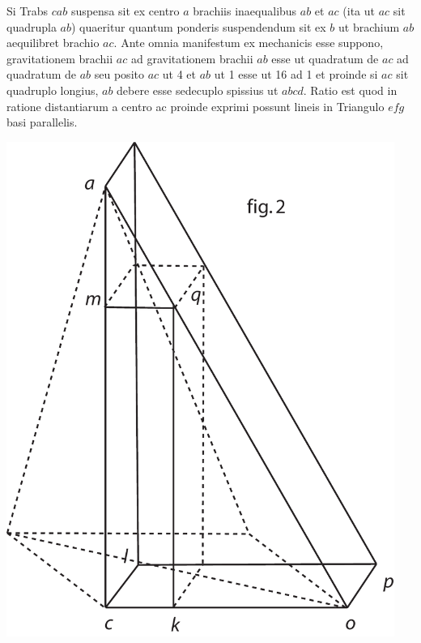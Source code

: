 \pend
\pstart
\vspace{2mm}
\pend
\newpage%
\count{}
\count{}
\count{}
\pstart%
\normalsize%
\noindent%
Si Trabs $cab$ suspensa sit ex centro $a$ brachiis inaequalibus $ab$ et $ac$ (ita ut $ac$ sit quadrupla $ab$) quaeritur quantum ponderis\protect{}  suspendendum sit ex $b$ ut brachium $ab$ aequilibret brachio $ac$.%
\newline%
\hspace*{7,5mm}%
Ante omnia manifestum ex mechanicis esse suppono, gravitationem\protect{}  brachii $ac$ ad gravitationem\protect{} brachii $ab$ esse ut quadratum de $ac$ ad quadratum de $ab$ seu posito $ac$ ut 4 et $ab$ ut 1 esse ut 16 ad 1 et proinde si $ac$ sit quadruplo longius, $ab$ debere esse sedecuplo spissius ut $abcd$.
\pend 
\pstart%
Ratio est quod  in ratione distantiarum a centro ac proinde exprimi possunt lineis in Triangulo $efg$ basi parallelis.
\pend
\vspace{3em}
\pstart
\hspace{-8mm}
\begin{minipage}[t]{0.5\textwidth}
\includegraphics[width=0.95\textwidth]{images/LH37,4_49r-3.pdf}
\end{minipage}
